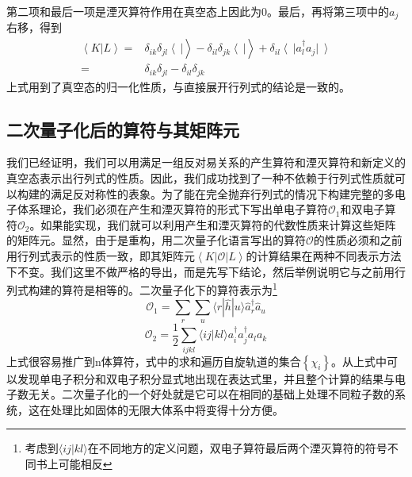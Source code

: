 \documentclass[12pt,a4paper,openany,twoside]{book}
\numberwithin{equation}{section}
\begin{document}
          第二项和最后一项是湮灭算符作用在真空态上因此为0。最后，再将第三项中的$a_j$右移，得到
          \begin{equation}
            \begin{aligned}
              \left\langle K\right|\left.L\right\rangle=&\delta_{ik}\delta_{jl}\left\langle\ \right|\left.\right\rangle-\delta_{il}\delta_{jk} \left\langle\ \right|\left.\right\rangle   +\delta_{il}\left\langle\ \right|a_l^\dagger a_j\left|\ \right\rangle\\
              =&\delta_{ik}\delta_{jl}-\delta_{il}\delta_{jk} 
            \end{aligned}
          \end{equation}
          上式用到了真空态的归一化性质，与直接展开行列式的结论是一致的。
        
        \subsection{二次量子化后的算符与其矩阵元}
          我们已经证明，我们可以用满足一组反对易关系的产生算符和湮灭算符和新定义的真空态表示出行列式的性质。因此，我们成功找到了一种不依赖于行列式性质就可以构建的满足反对称性的表象。为了能在完全抛弃行列式的情况下构建完整的多电子体系理论，我们必须在产生和湮灭算符的形式下写出单电子算符$\mathcal{O}_1$和双电子算符$\mathcal{O}_2$。如果能实现，我们就可以利用产生和湮灭算符的代数性质来计算这些矩阵的矩阵元。显然，由于是重构，用二次量子化语言写出的算符$\mathcal{O}$的性质必须和之前用行列式表示的性质一致，即其矩阵元$\left\langle K\right|\mathcal{O}\left|L\right\rangle$的计算结果在两种不同表示方法下不变。我们这里不做严格的导出，而是先写下结论，然后举例说明它与之前用行列式构建的算符是相等的。二次量子化下的算符表示为\footnote{考虑到$\langle i j | k l\rangle$在不同地方的定义问题，双电子算符最后两个湮灭算符的符号不同书上可能相反}
          \begin{equation}
            \mathcal{O}_1=\sum_{r} \sum_{u}\langle r|\hat{h}| u\rangle \hat{a}_{r}^{\dagger} \hat{a}_{u}
          \end{equation}
          \begin{equation}
            \mathcal{O}_{2}=\frac{1}{2} \sum_{i j k l}\langle i j | k l\rangle a_{i}^{\dagger} a_{j}^{\dagger} a_{l} a_{k}
          \end{equation}
          上式很容易推广到n体算符，式中的求和遍历自旋轨道的集合$\left\{\chi_i\right\}$。从上式中可以发现单电子积分和双电子积分显式地出现在表达式里，并且整个计算的结果与电子数无关。二次量子化的一个好处就是它可以在相同的基础上处理不同粒子数的系统，这在处理比如固体的无限大体系中将变得十分方便。
          
\end{document}
